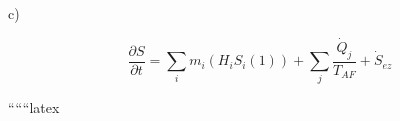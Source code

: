 c)

\[
\frac{\partial S}{\partial t} = \sum_i m_i (H_i S_i (1)) + \sum_j \frac{\dot{Q}_j}{T_{AF}} + \dot{S}_{ez}
\]

``````latex